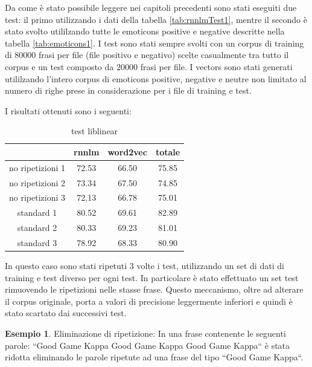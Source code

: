 \documentclass[a4paper,12pt,openright,twoside]{report}
\theoremstyle{definition}
\newtheorem{es}{Esempio}[section]
\begin{document}
Da come è stato possibile leggere nei capitoli precedenti sono stati eseguiti due test: il primo utilizzando i dati della tabella  \ref{tab:rnnlmTest1}, mentre il secondo è stato svolto utililzando tutte le emoticons positive 
e negative descritte nella tabella \ref{tab:emoticons1}. 
I test sono stati sempre svolti con un corpus di training di 80000 frasi per file (file positivo e negativo) scelte casualmente tra tutto il corpus e un test composto da 20000 frasi per file. I vectors sono stati generati utililzando l'intero corpus di emoticons positive, negative e neutre non limitato al numero di righe prese in considerazione per i file di training e test.

I risultati ottenuti sono i seguenti:
\begin{table}[h]
\begin{center}
\begin{tabular}{|c|c|c|c|}
\hline
& rnnlm & word2vec & totale \\
\hline
no ripetizioni 1 & 72.53 & 66.50 & 75.85  \\
\hline
no ripetizioni 2 & 73.34 & 67.50 & 74.85  \\
\hline
no ripetizioni 3 & 72.13 & 66.78 & 75.01  \\
\hline
standard 1 & 80.52 & 69.61 & 82.89 \\
\hline
standard 2 & 80.33 & 69.23 & 81.01 \\
\hline
standard 3 & 78.92 & 68.33 & 80.90 \\
\hline
\end{tabular}
\end{center}
\caption{test liblinear}
\label{tab:test1}
\end{table}

In questo caso sono stati ripetuti 3 volte i test, utilizzando un set di dati di training e test diverso per ogni test. In particolare è stato effettuato un set test rimuovendo le ripetizioni nelle stasse frase. Questo meccanismo, oltre ad alterare il corpus originale, porta a valori di precisione leggermente inferiori e quindi è stato scartato dai successivi test.
\begin{es}
Eliminazione di ripetizione: In una frase contenente le seguenti parole:  ``Good Game Kappa Good Game Kappa Good Game Kappa`` è stata ridotta eliminando le parole ripetute ad una frase del tipo ``Good Game Kappa``.
\end{es}
\end{document}
